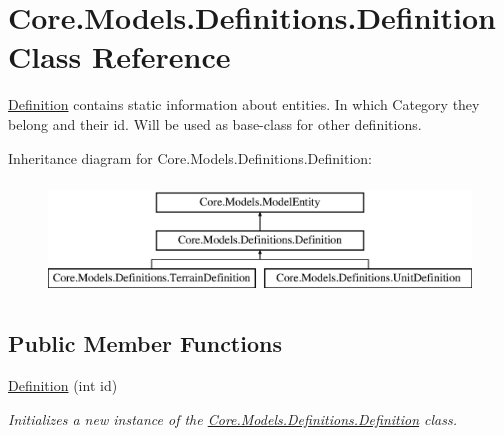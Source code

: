 \hypertarget{classCore_1_1Models_1_1Definitions_1_1Definition}{}\section{Core.\+Models.\+Definitions.\+Definition Class Reference}
\label{classCore_1_1Models_1_1Definitions_1_1Definition}


\hyperlink{classCore_1_1Models_1_1Definitions_1_1Definition}{Definition} contains static information about entities. In which Category they belong and their id. Will be used as base-\/class for other definitions.  


Inheritance diagram for Core.\+Models.\+Definitions.\+Definition\+:\begin{figure}[H]
\begin{center}
\leavevmode
\includegraphics[height=3.000000cm]{classCore_1_1Models_1_1Definitions_1_1Definition}
\end{center}
\end{figure}
\subsection*{Public Member Functions}
\begin{DoxyCompactItemize}
\item 
\hyperlink{classCore_1_1Models_1_1Definitions_1_1Definition_a58b73a00c59e999041dffb2b6a273d8f}{Definition} (int id)
\begin{DoxyCompactList}\small\item\em Initializes a new instance of the \hyperlink{classCore_1_1Models_1_1Definitions_1_1Definition}{Core.\+Models.\+Definitions.\+Definition} class. \end{DoxyCompactList}\end{DoxyCompactItemize}
